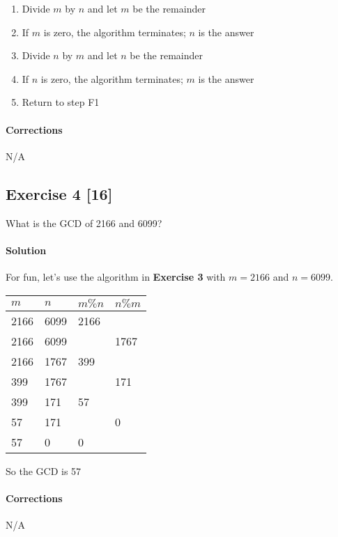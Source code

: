 \documentclass{report}
\begin{document}
			\begin{enumerate}
				\item Divide $m$ by $n$ and let $m$ be the remainder
				\item If $m$ is zero, the algorithm terminates; $n$ is the answer
				\item Divide $n$ by $m$ and let $n$ be the remainder
				\item If $n$ is zero, the algorithm terminates; $m$ is the answer
				\item Return to step F1
			\end{enumerate}
			
			\paragraph{Corrections} N/A
			
		
		\subsection*{Exercise 4 [16]} 
		
			What is the GCD of 2166 and 6099?
			
			\paragraph{Solution} For fun, let's use the algorithm in \textbf{Exercise 3} with $m=2166$ and $n=6099$.
			
			\begin{table}[h]
				\begin{tabular}{llll}
					$m$ & $n$ & $m\%n$ & $n\%m$ \\
					\hline
					2166 & 6099 & 2166 & \\
					2166 & 6099 & & 1767 \\
					2166 & 1767 & 399 & \\
					399 & 1767 & & 171 \\
					399 & 171 & 57 & \\
					57 & 171 & & 0 \\
					57 & 0 & 0 & 
				\end{tabular}
			\end{table}
		
			So the GCD is 57
			
			\paragraph{Corrections} N/A
			
\end{document}
